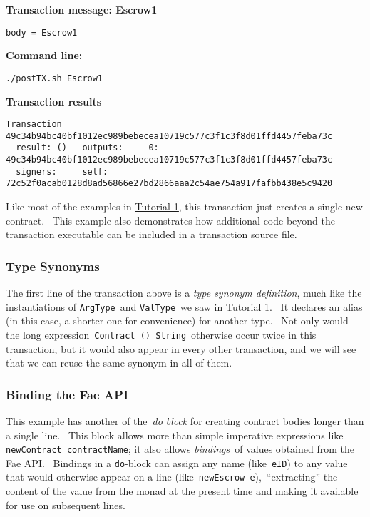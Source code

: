 \documentclass[11pt]{article}
\newcommand{\codeblock}[1]{\begin{mdframed}[
    backgroundcolor=header-color,
    linecolor=header-color,
    innertopmargin=10pt,
    ]{\texttt{#1}}\end{mdframed}}
\DeclareRobustCommand{\fuline}[1]{\texorpdfstring{\uline{#1}}{#1}}
\begin{document}
\textbf{Transaction message: Escrow1}

\codeblock{body = Escrow1}

\textbf{Command line:}

\codeblock{.\slash{}postTX.sh Escrow1}

\textbf{Transaction results}

\codeblock{Transaction 49c34b94bc40bf1012ec989bebecea10719c577c3f1c3f8d01ffd4457feba73c\newline
  result: ()\newline
  outputs:\newline
    0: 49c34b94bc40bf1012ec989bebecea10719c577c3f1c3f8d01ffd4457feba73c\newline
  signers:\newline
    self: 72c52f0acab0128d8ad56866e27bd2866aaa2c54ae754a917fafbb438e5c9420}

Like most of the examples in \href{https://consensys.quip.com/IHP2AzL922EJ/Tutorial-1-Transactions-and-contracts}{\fuline{Tutorial 1}}, this transaction just creates a single new contract.  This example also demonstrates how additional code beyond the transaction executable can be included in a transaction source file.

\subsubsection{Type Synonyms}
\vspace{5.5pt}

The first line of the transaction above is a \textit{type synonym definition}, much like the instantiations of \texttt{ArgType} and \texttt{ValType} we saw in Tutorial 1.  It declares an alias (in this case, a shorter one for convenience) for another type.  Not only would the long expression \texttt{Contract () String} otherwise occur twice in this transaction, but it would also appear in every other transaction, and we will see that we can reuse the same synonym in all of them.

\subsubsection{Binding the Fae API}
\vspace{5.5pt}

This example has another of the \textit{do block }for creating contract bodies longer than a single line.  This block allows more than simple imperative expressions like \texttt{newContract contractName}; it also allows \textit{bindings} of values obtained from the Fae API.  Bindings in a \texttt{do}-block can assign any name (like \texttt{eID}) to any value that would otherwise appear on a line (like \texttt{newEscrow e}), “extracting” the content of the value from the monad at the present time and making it available for use on subsequent lines.
\end{document}
